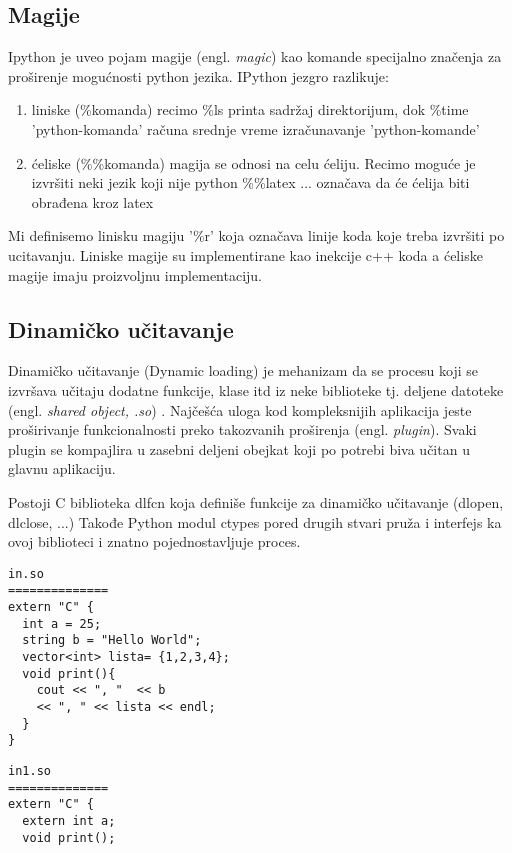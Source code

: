 \documentclass[a4paper]{article}
\newcommand{\eng}[1]{(engl. \textit{#1})}
\begin{document}
{\subsection{Magije}

Ipython je uveo pojam magije \eng{magic} kao komande specijalno značenja za
proširenje mogućnosti python jezika. IPython jezgro razlikuje: \cite{magic}
\begin{enumerate}
  \item liniske (\%komanda) 
    recimo \%ls printa sadržaj direktorijum, dok \%time 'python-komanda'
    računa srednje vreme izračunavanje 'python-komande'
  \item ćeliske (\%\%komanda) 
    magija se odnosi na celu ćeliju. Recimo moguće je izvršiti neki jezik koji nije python
    \%\%latex ... označava da će ćelija biti obrađena kroz latex
\end{enumerate}

Mi definisemo linisku magiju '\%r' koja označava linije koda koje treba izvršiti po ucitavanju.
Liniske magije su implementirane kao inekcije c++ koda  a ćeliske magije
imaju proizvoljnu implementaciju.



\subsection{Dinamičko učitavanje}
\label{sec:dUcitavanje}

Dinamičko učitavanje (Dynamic loading) je mehanizam  da se procesu koji se izvršava
učitaju dodatne funkcije, klase itd iz neke biblioteke tj.
deljene datoteke \eng{shared object, .so} 
\cite{LinkersAndLoaders}. Najčešća uloga kod kompleksnijih aplikacija
jeste proširivanje funkcionalnosti preko takozvanih proširenja \eng{plugin}.
Svaki plugin se kompajlira u zasebni deljeni obejkat koji po potrebi biva učitan u glavnu aplikaciju.


Postoji C biblioteka dlfcn koja definiše funkcije za dinamičko učitavanje (dlopen, dlclose, ...)
Takođe Python modul ctypes pored drugih stvari pruža i interfejs ka ovoj biblioteci i znatno
pojednostavljuje proces.  \cite{dlopen}

\noindent\begin{minipage}[t]{.45\textwidth} \begin{verbatim}
in.so
==============
extern "C" {
  int a = 25;
  string b = "Hello World";
  vector<int> lista= {1,2,3,4};
  void print(){
    cout << ", "  << b
    << ", " << lista << endl;
  }
}
\end{verbatim} \end{minipage}\hfill
\begin{minipage}[t]{.45\textwidth} \begin{verbatim}
in1.so
==============
extern "C" {
  extern int a;
  void print();


\end{verbatim}
\end{minipage}}
\end{document}
